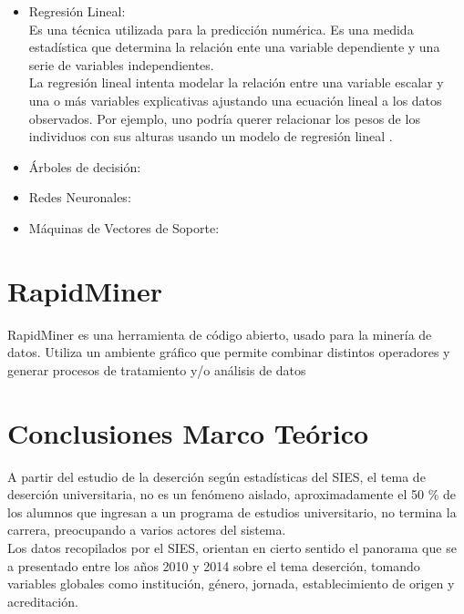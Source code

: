 \begin{itemize}
	\item Regresión Lineal:\\
Es una técnica utilizada para la predicción numérica. Es una medida estadística que determina la relación ente una variable dependiente y una serie de variables independientes.\\
La regresión lineal intenta modelar la relación entre una variable escalar y una o más variables explicativas ajustando una ecuación lineal a los datos observados. Por ejemplo, uno podría querer relacionar los pesos de los individuos con sus alturas usando un modelo de regresión lineal \cite{rl}.

	\item Árboles de decisión:\\


	\item Redes Neuronales:\\


	\item Máquinas de Vectores de Soporte:\\


\end{itemize}  

\section{RapidMiner}

RapidMiner es una herramienta de código abierto, usado para la minería de datos. Utiliza un ambiente gráfico que permite combinar distintos operadores y generar procesos de tratamiento y/o análisis de datos\\

\section{Conclusiones Marco Teórico}

A partir del estudio de la deserción según estadísticas del SIES, el tema de deserción universitaria, no es un fenómeno aislado, aproximadamente el 50 \%  de los alumnos que ingresan a un programa de estudios universitario, no termina la carrera, preocupando a varios actores del sistema.\\

Los datos recopilados por el SIES, orientan en cierto sentido el panorama que se a presentado entre los años 2010 y 2014 sobre el tema deserción, tomando variables globales como institución, género, jornada, establecimiento de origen y acreditación.\\

